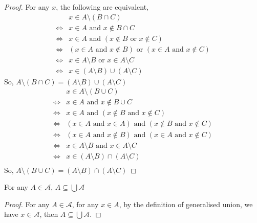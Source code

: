 \begin{proof}
    For any $x$, the following are equivalent,
    \begin{align*}
        & x\in A\setminus (B\cap C)\\
        \Leftrightarrow & x\in A \text{ and }x\not\in B\cap C\\
        \Leftrightarrow & x\in A \text{ and }(x\not\in B\text{ or }x\not\in C)\\
        \Leftrightarrow & (x\in A\text{ and }x\not\in B)\text{ or }(x\in A\text{ and }x\not\in C)\\
        \Leftrightarrow & x\in A\setminus B\text{ or }x\in A\setminus C\\
        \Leftrightarrow & x\in (A\setminus B)\cup(A\setminus C)
    \end{align*}
    So, $A\setminus(B\cap C) = (A\setminus B) \cup (A\setminus C)$\\
    \begin{align*}
        & x\in A\setminus (B\cup C)\\
        \Leftrightarrow & x\in A\text{ and }x\not\in B\cup C\\
        \Leftrightarrow & x\in A \text{ and }(x\not\in B\text{ and }x\not\in C)\\
        \Leftrightarrow & (x\in A \text{ and } x\in A)\text{ and }(x\not\in B\text{ and }x\not\in C)\\
        \Leftrightarrow & (x\in A\text{ and }x\not\in B)\text{ and }(x\in A\text{ and }x\not\in C)\\
        \Leftrightarrow & x\in A\setminus B\text{ and }x\in A\setminus C\\
        \Leftrightarrow & x\in(A\setminus B)\cap(A\setminus C)\\
    \end{align*}
    So, $A\setminus (B\cup C) = (A\setminus B)\cap (A\setminus C)$
\end{proof}
\begin{prop}
    For any $A\in\mathscr A$, $A\subseteq \bigcup\mathscr A$
\end{prop}
\begin{proof}
    For any $A\in\mathscr A$, for any $x\in A$, by the definition of generalised union, we have $x\in\mathscr A$, then $A\subseteq \bigcup \mathscr A$.
\end{proof}
